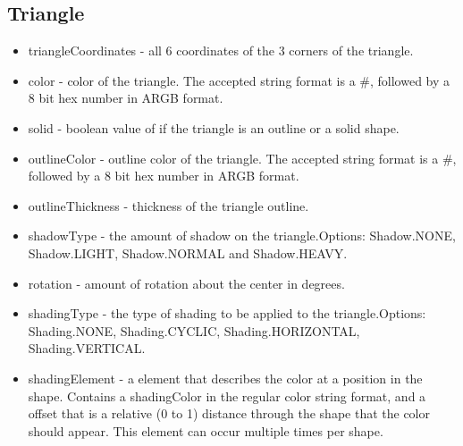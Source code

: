 \documentclass{article}
\begin{document}
\subsection{Triangle}
\begin{itemize}
\item triangleCoordinates - all 6 coordinates of the 3 corners of the triangle.
\item color - color of the triangle. The accepted string format is a \#, followed by a 8 bit hex number in ARGB format.
\item solid - boolean value of if the triangle is an outline or a solid shape.
\item outlineColor - outline color of the triangle. The accepted string format is a \#, followed by a 8 bit hex number in ARGB format.
\item outlineThickness - thickness of the triangle outline.
\item shadowType - the amount of shadow on the triangle.\newline  Options: Shadow.NONE, Shadow.LIGHT, Shadow.NORMAL and Shadow.HEAVY.
\item rotation - amount of rotation about the center in degrees. 
\item shadingType - the type of shading to be applied to the triangle.\newline  Options: Shading.NONE, Shading.CYCLIC, Shading.HORIZONTAL, Shading.VERTICAL.
\item shadingElement - a element that describes the color at a position in the shape. Contains a shadingColor in the regular color string format, and a offset that is a relative (0 to 1) distance through the shape that the color should appear. This element can occur multiple times per shape.
\end{itemize}
\end{document}
